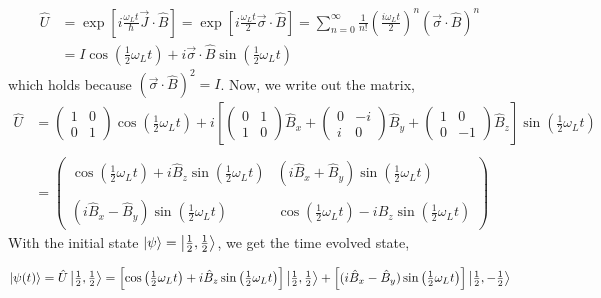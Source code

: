 \documentclass[12pt]{extarticle}
\begin{document}
\begin{align*}
\hat{U} & = \exp{\left[i \frac{\omega_L t }{\hbar} \vec{J} \cdot \hat{B} \right]} = \exp{\left[i \frac{\omega_L t }{2} \vec{\sigma} \cdot \hat{B} \right]} = \sum_{n = 0}^{\infty} \frac{1}{n!} \left(\frac{i \omega_L t}{2}\right)^n ( \vec{\sigma} \cdot \hat{B} )^n \\
& = I \cos{\left(\tfrac{1}{2} \omega_L t \right)} + i \vec{\sigma} \cdot \hat{B} \sin{\left(\tfrac{1}{2} \omega_L t \right)}
\end{align*} 
which holds because $(\vec{\sigma} \cdot \hat{B})^2 = I$. Now, we write out the matrix,
\begin{align*}
\hat{U} & = 
\begin{pmatrix}
1 & 0 \\
0 & 1
\end{pmatrix} 
\cos{\left(\tfrac{1}{2} \omega_L t \right)} + 
i \left[
\begin{pmatrix}
0 & 1 \\
1 & 0
\end{pmatrix} \hat{B}_x +
\begin{pmatrix}
0 & -i \\
i & 0
\end{pmatrix} \hat{B}_y  +
\begin{pmatrix}
1 & 0 \\
0 & -1
\end{pmatrix} \hat{B}_z \right] \sin{\left(\tfrac{1}{2} \omega_L t \right)} \\\\
& = 
\begin{pmatrix}
\cos{\left(\tfrac{1}{2} \omega_L t \right)} + i \hat{B}_z \sin{\left(\tfrac{1}{2} \omega_L t \right)} & (i \hat{B}_x + \hat{B}_y) \sin{\left(\tfrac{1}{2} \omega_L t \right)} \\ \\
(i \hat{B}_x - \hat{B}_y) \sin{\left(\tfrac{1}{2} \omega_L t \right)}  & \cos{\left(\tfrac{1}{2} \omega_L t \right)} - i \hat{B}_z \sin{\left(\tfrac{1}{2} \omega_L t \right)}
\end{pmatrix}
\end{align*}
With the initial state $\left| \psi \right> = \left| \tfrac{1}{2}, \tfrac{1}{2} \right>$, we get the time evolved state,

\[\left| \psi(t) \right> = \hat{U} \left| \tfrac{1}{2}, \tfrac{1}{2} \right> = \left[ \cos{\left(\tfrac{1}{2} \omega_L t \right)} + i \hat{B}_z \sin{\left(\tfrac{1}{2} \omega_L t \right)} \right] \left| \tfrac{1}{2}, \tfrac{1}{2} \right> + \left[ (i \hat{B}_x - \hat{B}_y) \sin{\left(\tfrac{1}{2} \omega_L t \right)} \right] \left| \tfrac{1}{2}, - \tfrac{1}{2} \right>  \]
\end{document}
